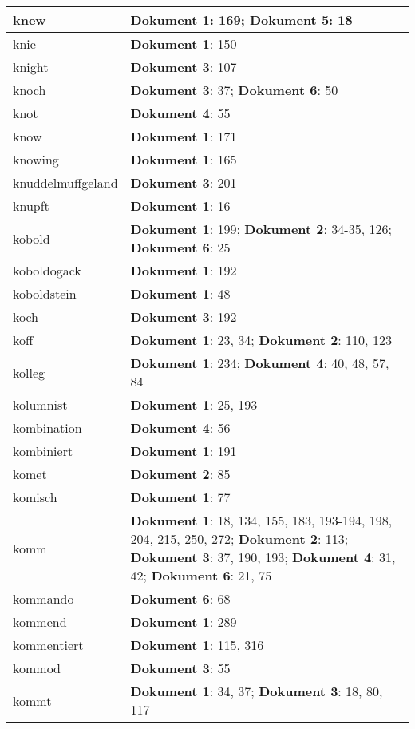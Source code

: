 \documentclass[a5paper]{article}
\begin{document}
\begin{longtable}[l]{|l|p{3in}|}
\hline
knew & \textbf{Dokument 1}: 169; \textbf{Dokument 5}: 18 \\
\hline
knie & \textbf{Dokument 1}: 150 \\
\hline
knight & \textbf{Dokument 3}: 107 \\
\hline
knoch & \textbf{Dokument 3}: 37; \textbf{Dokument 6}: 50 \\
\hline
knot & \textbf{Dokument 4}: 55 \\
\hline
know & \textbf{Dokument 1}: 171 \\
\hline
knowing & \textbf{Dokument 1}: 165 \\
\hline
knuddelmuffgeland & \textbf{Dokument 3}: 201 \\
\hline
knupft & \textbf{Dokument 1}: 16 \\
\hline
kobold & \textbf{Dokument 1}: 199; \textbf{Dokument 2}: 34-35, 126; \textbf{Dokument 6}: 25 \\
\hline
koboldogack & \textbf{Dokument 1}: 192 \\
\hline
koboldstein & \textbf{Dokument 1}: 48 \\
\hline
koch & \textbf{Dokument 3}: 192 \\
\hline
koff & \textbf{Dokument 1}: 23, 34; \textbf{Dokument 2}: 110, 123 \\
\hline
kolleg & \textbf{Dokument 1}: 234; \textbf{Dokument 4}: 40, 48, 57, 84 \\
\hline
kolumnist & \textbf{Dokument 1}: 25, 193 \\
\hline
kombination & \textbf{Dokument 4}: 56 \\
\hline
kombiniert & \textbf{Dokument 1}: 191 \\
\hline
komet & \textbf{Dokument 2}: 85 \\
\hline
komisch & \textbf{Dokument 1}: 77 \\
\hline
komm & \textbf{Dokument 1}: 18, 134, 155, 183, 193-194, 198, 204, 215, 250, 272; \textbf{Dokument 2}: 113; \textbf{Dokument 3}: 37, 190, 193; \textbf{Dokument 4}: 31, 42; \textbf{Dokument 6}: 21, 75 \\
\hline
kommando & \textbf{Dokument 6}: 68 \\
\hline
kommend & \textbf{Dokument 1}: 289 \\
\hline
kommentiert & \textbf{Dokument 1}: 115, 316 \\
\hline
kommod & \textbf{Dokument 3}: 55 \\
\hline
kommt & \textbf{Dokument 1}: 34, 37; \textbf{Dokument 3}: 18, 80, 117 \\
\hline

\end{longtable}
\end{document}
